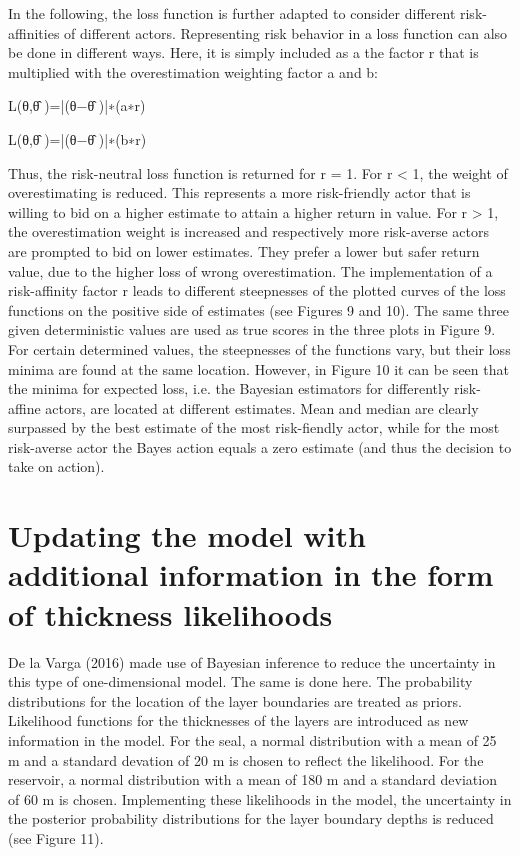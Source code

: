 	In the following, the loss function is further adapted to consider different risk-affinities of different actors. Representing risk behavior in a loss function can also be done in different ways. Here, it is simply included as a the factor r that is multiplied with the overestimation weighting factor a and b:
	
	L(θ,θ̂ )=|(θ−θ̂ )|∗(a∗r)
	
	L(θ,θ̂ )=|(θ−θ̂ )|∗(b∗r)
	
	Thus, the risk-neutral loss function is returned for r = 1. For r < 1, the weight of overestimating is reduced. This represents a more risk-friendly actor that is willing to bid on a higher estimate to attain a higher return in value. For r > 1, the overestimation weight is increased and respectively more risk-averse actors are prompted to bid on lower estimates. They prefer a lower but safer return value, due to the higher loss of wrong overestimation. The implementation of a risk-affinity factor r leads to different steepnesses of the plotted curves of the loss functions on the positive side of estimates (see Figures 9 and 10). The same three given deterministic values are used as true scores in the three plots in Figure 9. For certain determined values, the steepnesses of the functions vary, but their loss minima are found at the same location. However, in Figure 10 it can be seen that the minima for expected loss, i.e. the Bayesian estimators for differently risk-affine actors, are located at different estimates. Mean and median are clearly surpassed by the best estimate of the most risk-fiendly actor, while for the most risk-averse actor the Bayes action equals a zero estimate (and thus the decision to take on action).
	
	\section{Updating the model with additional information in the form of thickness likelihoods}
	
	De la Varga (2016) made use of Bayesian inference to reduce the uncertainty in this type of one-dimensional model. The same is done here. The probability distributions for the location of the layer boundaries are treated as priors. Likelihood functions for the thicknesses of the layers are introduced as new information in the model. For the seal, a normal distribution with a mean of 25 m and a standard devation of 20 m is chosen to reflect the likelihood. For the reservoir, a normal distribution with a mean of 180 m and a standard deviation of 60 m is chosen. Implementing these likelihoods in the model, the uncertainty in the posterior probability distributions for the layer boundary depths is reduced (see Figure 11).
	

